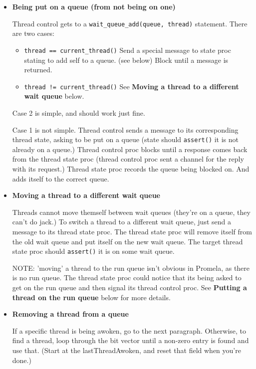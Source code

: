 \begin{itemize}
\item {\bf Being put on a queue (from not being on one)}

Thread control gets to a {\tt wait_queue_add(queue, thread)}
statement.  There are two cases:

\begin{itemize}

  \item {\tt thread == current_thread()} Send a special message to
  state proc stating to add self to a queue. (see below) Block until a
  message is returned.

  \item {\tt thread != current_thread()} See {\bf Moving a thread
        to a different wait queue} below.
        
\end{itemize}

Case 2 is simple, and should work just fine.

Case 1 is not simple.  Thread control sends a message to its
corresponding thread state, asking to be put on a queue (state should
{\tt assert()} it is not already on a queue.)  Thread control proc
blocks until a response comes back from the thread state proc (thread
control proc sent a channel for the reply with its request.)  Thread
state proc records the queue being blocked on.  And adds itself to the
correct queue.

\item {\bf Moving a thread to a different wait queue}

Threads cannot move themself between wait queues (they're on a queue,
they can't do jack.)  To switch a thread to a different wait queue,
just send a message to its thread state proc.  The thread state proc
will remove itself from the old wait queue and put itself on the
new wait queue.  The target thread state proc should {\tt assert()} it
is on some wait queue.

NOTE: 'moving' a thread to the run queue isn't obvious in Promela, as
there is no run queue.  The thread state proc could notice that its
being asked to get on the run queue and then signal its thread control
proc.  See {\bf Putting a thread on the run queue} below for more
details.

\item {\bf Removing a thread from a queue}

If a specific thread is being awoken, go to the next paragraph.
Otherwise, to find a thread, loop through the bit vector until a
non-zero entry is found and use that.  (Start at the lastThreadAwoken,
and reset that field when you're done.)


\end{itemize}
